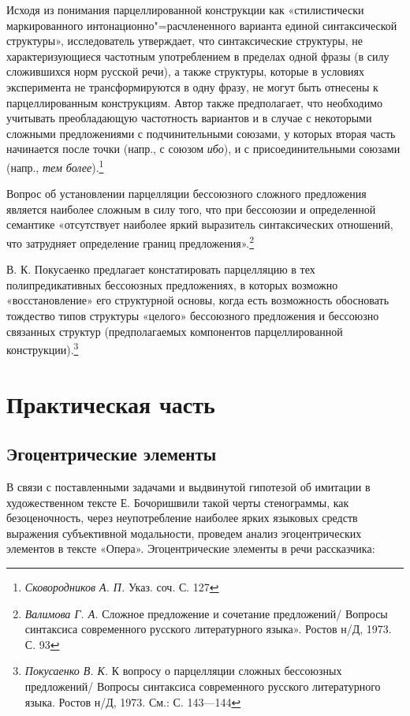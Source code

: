\documentclass{kursa4}
\begin{document}
      {Исходя из понимания парцеллированной конструкции как «стилистически маркированного интонационно"=расчлененного варианта единой синтаксической структуры», исследователь утверждает, что синтаксические структуры, не характеризующиеся частотным употреблением в пределах одной фразы (в силу сложившихся норм русской речи), а также структуры, которые в условиях эксперимента не трансформируются в одну фразу, не могут быть отнесены к парцеллированным конструкциям. Автор также предполагает, что необходимо учитывать преобладающую частотность вариантов и в случае с некоторыми сложными предложениями с подчинительными союзами, у которых вторая часть начинается после точки (напр., с союзом }\textit{{ибо}}{), и с присоединительными союзами (напр., }\textit{{тем более}}{).}\footnote{\textit{{ Сковородников А. П. }}{Указ. соч. С. 127}}

      {Вопрос об установлении парцелляции бессоюзного сложного предложения является наиболее сложным в силу того, что при бессоюзии и определенной семантике «отсутствует наиболее яркий выразитель синтаксических отношений, что затрудняет определение границ предложения».}\footnote{{ }\textit{{Валимова Г. А. }}{Сложное предложение и сочетание предложений/ Вопросы синтаксиса современного русского литературного языка». Ростов н/Д, 1973. С. 93}}

      {В. К. Покусаенко предлагает констатировать парцелляцию в тех полипредикативных бессоюзных предложениях, в которых возможно «восстановление» его структурной основы, когда есть возможность обосновать тождество типов структуры «целого» бессоюзного предложения и бессоюзно связанных структур (предполагаемых компонентов парцеллированной конструкции).}\footnote{{ }\textit{{Покусаенко В. К. }}{К вопросу о парцелляции сложных бессоюзных предложений/ Вопросы синтаксиса современного русского литературного языка. Ростов н/Д, 1973. См.: С. 143—144}}

  \chapter{Практическая часть}

    \section{Эгоцентрические элементы}

      В связи с поставленными задачами и выдвинутой гипотезой об имитации в художественном тексте Е. Бочоришвили такой черты стенограммы, как безоценочность, через неупотребление наиболее ярких языковых средств выражения субъективной модальности, проведем анализ эгоцентрических элементов в тексте «Опера». Эгоцентрические элементы в речи рассказчика:
\end{document}
